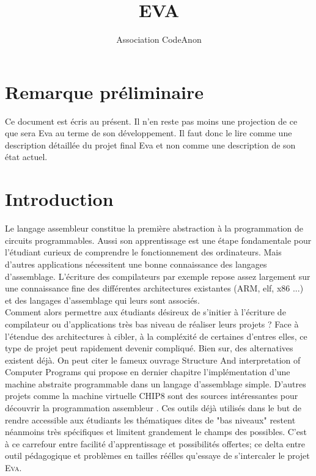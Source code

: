 \documentclass[11pt,twoside,french]{article}
\newcommand{\noun}[1]{\textsc{#1}}
\newcommand{\noun}[1]{\textsc{#1}}
\begin{document}
\title{EVA}
\author{Association CodeAnon}

\maketitle
\clearpage{}

\section*{Remarque préliminaire}

Ce document est écris au présent. Il n'en reste pas moins une projection de ce que sera Eva au terme de son développement. Il faut donc le lire comme une description détaillée du projet final Eva et non comme une description de son état actuel.

\cleardoublepage

\tableofcontents
\cleardoublepage

\vfill

\section{Introduction}

Le langage assembleur constitue la première abstraction à la programmation
de circuits programmables. Aussi son apprentissage est une étape fondamentale pour l'étudiant curieux de comprendre le fonctionnement des ordinateurs. Mais d'autres applications nécessitent une bonne connaissance des langages d'assemblage. L'écriture des compilateurs par exemple repose assez largement sur une connaissance fine des différentes architectures existantes (ARM, elf, x86 ...) et des langages d'assemblage qui leurs sont associés. \\

Comment alors permettre aux étudiants désireux de s'initier à l'écriture de compilateur ou d'applications très bas niveau de réaliser leurs projets ? Face à l'étendue des architectures à cibler, à la compléxité de certaines d'entres elles, ce type de projet peut rapidement devenir compliqué. Bien sur, des alternatives existent déjà. On peut citer le fameux ouvrage Structure And interpretation of Computer Programs \cite{SICP} qui propose en dernier chapitre l'implémentation d'une machine abstraite programmable dans un langage d'assemblage simple. D'autres projets comme la machine virtuelle CHIP8 sont des sources intéressantes pour découvrir la programmation assembleur \cite{CHIP8}. Ces outils déjà utilisés dans le but de rendre accessible aux étudiants les thématiques dites de "bas niveaux" restent néanmoins très spécifiques et limitent grandement le champs des possibles. C'est à ce carrefour entre facilité d'apprentissage et possibilités offertes; ce delta entre outil pédagogique et problèmes en tailles réélles qu'essaye de s'intercaler le projet \noun{Eva}. \\
\end{document}
